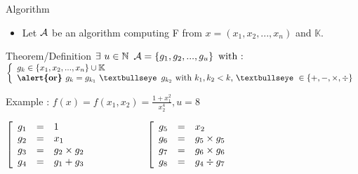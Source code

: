 \begin{frame}{Algorithm}

\begin{itemize}
    \item Let $\mathcal{A}$ be an algorithm computing F from $x = (x_1,x_2,...,x_n)$ and $\mathbb{K}$.
\end{itemize}
    
\begin{block}{Theorem/Definition}
        $
        \exists\,\, u \in \mathbb{N} \,\,\, \mathcal{A} = \left\{ g_1,g_2,...,g_u \right\}
        \textrm{ with :} 
        $
        \hskip 0.3cm
        $
        \left\{
        \begin{array}{l}
        g_k \in \left\{x_1,x_2,...,x_n\right\} \cup \mathbb{K}\\
        \textrm{\textbf{\alert{or} }} g_k = g_{k_1} \textrm{ \textbullseye\, } g_{k_2}\textrm{ with }k_1,k_2 < k \textrm{, \textbullseye }\in \{ +,-,\times, \div \}
        \end{array}
        \right.
        $
\end{block}

\begin{block}{Example : $f(x) = f(x_1,x_2) = \frac{1+x_1^2}{x_2^4}, u = 8$}

{\centering%
    $
    \left[
    \begin{array}{l c l}
        g_1 & = & 1 \\   
        g_2 & = & x_1 \\   
        g_3 & = & g_2 \times g_2 \\  
        g_4 & = & g_1 + g_3 \\
    \end{array}
    \right.
    \hskip 2cm
    \left[
    \begin{array}{l c l}
        g_5 & = & x_2 \\   
        g_6 & = & g_5 \times g_5 \\   
        g_7 & = & g_6 \times g_6 \\  
        g_8 & = & g_4 \div g_7 \\
    \end{array}
    \right.
    $
}

\end{block}
\end{frame}



